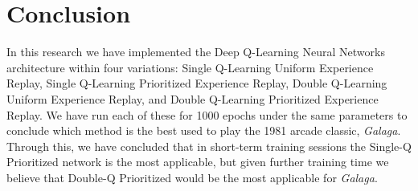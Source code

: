 \documentclass[conference]{IEEEtran}
\begin{document}
\section{Conclusion}
In this research we have implemented the Deep Q-Learning Neural Networks architecture within four variations: Single Q-Learning Uniform Experience Replay, Single Q-Learning Prioritized Experience Replay, Double Q-Learning Uniform Experience Replay, and Double Q-Learning Prioritized Experience Replay. We have run each of these for 1000 epochs under the same parameters to conclude which method is the best used to play the 1981 arcade classic, \textit{Galaga}. Through this, we have concluded that in short-term training sessions the Single-Q Prioritized network is the most applicable, but given further training time we believe that Double-Q Prioritized would be the most applicable for \textit{Galaga}.


\clearpage

\onecolumn
\section*{}
\end{document}
